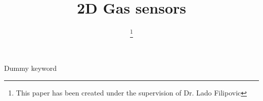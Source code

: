 \documentclass[conference]{IEEEtran}
\begin{document}
\title{2D Gas sensors}

\author{
\thanks{This paper has been created under the supervision of Dr. Lado Filipovic}
}

\maketitle



\begin{IEEEkeywords}
Dummy keyword
\end{IEEEkeywords}







\printglossary
\end{document}

